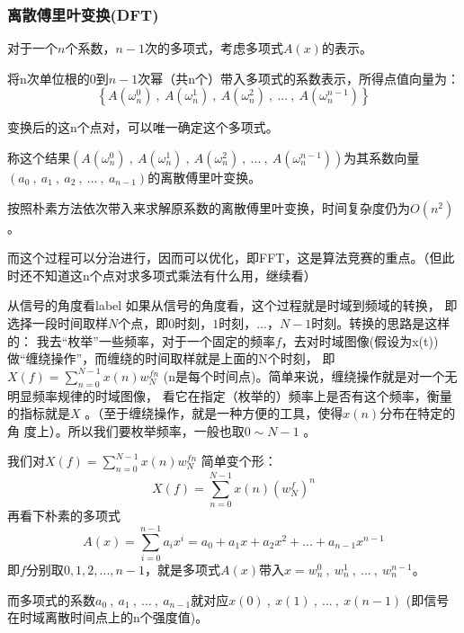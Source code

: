 \subsubsection{离散傅里叶变换(DFT)}

对于一个$n$个系数，$n-1$次的多项式，考虑多项式$A(x)$的表示。

将n次{\heiti 单位根的0到$n-1$次幂}（共n个）带入多项式的系数表示，所得点值向量为：
$$
\left \{  A(\omega_n^0)\ ,\ A(\omega_n^1)\ ,\ A(\omega_n^2)\ ,\ ...\ ,\ A(\omega_n^{n-1}) \right \}
$$
\begin{note}
变换后的这n个点对，可以唯一确定这个多项式。
\end{note}

称这个结果$(A(\omega_n^0)\ ,\ A(\omega_n^1)\ ,\ A(\omega_n^2)\ ,\ ...\ ,\ A(\omega_n^{n-1}))$为其系数向量$(a_0\ ,\ a_1\ ,\ a_2\ ,\ ...\ ,\ a_{n-1})$的{\heiti 离散傅里叶变换}。

按照朴素方法依次带入来求解原系数的离散傅里叶变换，时间复杂度仍为$O(n^2)$。

而这个过程可以{\heiti 分治进行}，因而可以优化，即FFT，这是算法竞赛的重点。（{\heiti 但此时还不知道这n个点对求多项式乘法有什么用，继续看}）


\begin{definition}{从信号的角度看}{label}
如果从信号的角度看，这个过程就是{\heiti 时域到频域的转换}， 即选择一段时间取样$N$个点，即$0$时刻，$1$时刻，...，$N-1$时刻。转换的思路是这样的：
我去“枚举”一些频率，对于一个固定的频率$f$，去对{\heiti 时域图像(假设为x(t))}做“缠绕操作”，而缠绕的时间取样就是上面的N个时刻，
即$X(f)=\sum_{n=0}^{N-1}x(n)w_N^{fn}$  (n是每个时间点)。简单来说，缠绕操作就是对一个{\heiti 无明显频率规律}的时域图像，
看它在指定（枚举的）频率上是否有这个频率，衡量的指标就是$X$ 。（至于缠绕操作，就是一种方便的工具，使得$x(n)$分布在特定的角
度上）。所以我们要枚举频率，一般也取$0\sim N-1$  。

我们对$X(f)=\sum_{n=0}^{N-1}x(n)w_N^{fn}$   简单变个形：
$$
X(f)=\sum_{n=0}^{N-1}x(n)(w_N^{f})^n
$$
再看下朴素的多项式
$$
A(x)=\sum_{i=0}^{n-1}a_ix^i=a_0+a_1x+a_2x^2+...+a_{n-1}x^{n-1}
$$
即$f$分别取$0,1,2,...,n-1$，就是多项式$A(x)$带入$x=w_n^0\ ,\ w_n^1\ ,\ ...\ ,\ w_n^{n-1}$。

而多项式的系数$a_0\ ,\ a_1\ ,\ ...\ ,\ a_{n-1}$就对应$x(0)\ ,\ x(1)\ ,\ ...\ ,\ x(n-1)$ ({\heiti 即信号在时域离散时间点上的n个强度值})。

\end{definition}

